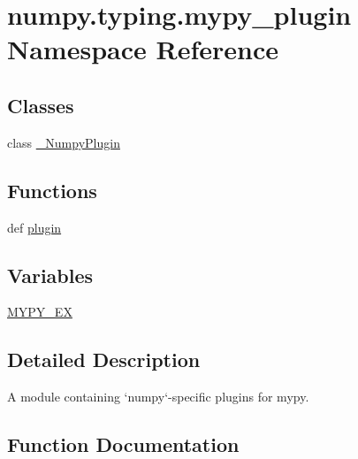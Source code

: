 \hypertarget{namespacenumpy_1_1typing_1_1mypy__plugin}{}\section{numpy.\+typing.\+mypy\+\_\+plugin Namespace Reference}
\label{namespacenumpy_1_1typing_1_1mypy__plugin}
\subsection*{Classes}
\begin{DoxyCompactItemize}
\item 
class \hyperlink{classnumpy_1_1typing_1_1mypy__plugin_1_1__NumpyPlugin}{\+\_\+\+Numpy\+Plugin}
\end{DoxyCompactItemize}
\subsection*{Functions}
\begin{DoxyCompactItemize}
\item 
def \hyperlink{namespacenumpy_1_1typing_1_1mypy__plugin_a6074b8dc61a00ed2a8881365628534f7}{plugin}
\end{DoxyCompactItemize}
\subsection*{Variables}
\begin{DoxyCompactItemize}
\item 
\hyperlink{namespacenumpy_1_1typing_1_1mypy__plugin_adbef94b88548869152a8beb17b3b658e}{M\+Y\+P\+Y\+\_\+\+EX}
\end{DoxyCompactItemize}


\subsection{Detailed Description}
\begin{DoxyVerb}A module containing `numpy`-specific plugins for mypy.\end{DoxyVerb}
 

\subsection{Function Documentation}
\mbox{\label{namespacenumpy_1_1typing_1_1mypy__plugin_a6074b8dc61a00ed2a8881365628534f7}} 
